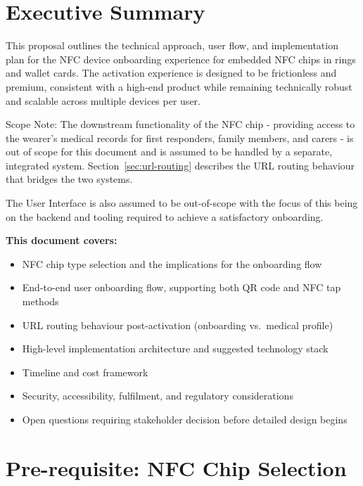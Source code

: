 \documentclass[
	a4paper, %
]{ChaosEngineReport}
\begin{document}
\newpage
\section{Executive Summary} 
This proposal outlines the technical approach, user flow, and implementation plan for the NFC device onboarding experience for embedded NFC chips in rings and wallet cards. The activation experience is designed to be frictionless and premium, consistent with a high-end product while remaining technically robust and scalable across multiple devices per user.

\begin{callout_box}{Scope Note:}
  The downstream functionality of the NFC chip - providing access to the wearer's medical records for first responders, family members, and carers - is out of scope for this document and is assumed to be handled by a separate, integrated system. Section~\ref{sec:url-routing} describes the URL routing behaviour that bridges the two systems.

  The User Interface is also assumed to be out-of-scope with the focus of this being on the backend and tooling required to achieve a satisfactory onboarding.
\end{callout_box}

\textbf{This document covers:}
\begin{itemize}
  \item NFC chip type selection and the implications for the onboarding flow
  \item End-to-end user onboarding flow, supporting both QR code and NFC tap methods
  \item URL routing behaviour post-activation (onboarding vs.\ medical profile)
  \item High-level implementation architecture and suggested technology stack
  \item Timeline and cost framework
  \item Security, accessibility, fulfilment, and regulatory considerations
  \item Open questions requiring stakeholder decision before detailed design begins
\end{itemize}

\section {Pre-requisite: NFC Chip Selection}
\end{document}
